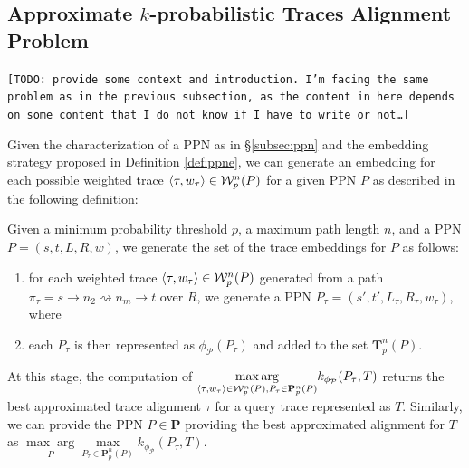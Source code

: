 \subsection{Approximate $k$-probabilistic Traces Alignment Problem}\label{subsec:akptap}
\texttt{\color{red}[TODO: provide some context and introduction. I'm facing the same problem as in the previous subsection, as the content in here depends on some content that I do not know if I have to write or not\dots]}

Given the characterization of a PPN as in \S\ref{subsec:ppn} and the embedding strategy proposed in Definition \ref{def:ppne}, we can generate an embedding for each possible weighted trace $\braket{\tau,w_\tau}\in\mathcal{W}_p^n(P)$ for a given PPN $P$ as described in the following definition:
\begin{definition}
Given a minimum probability threshold $p$, a maximum path length $n$, and a PPN $P=(s,t,L,R,w)$, we generate the set of the trace embeddings for $P$ as follows:
\begin{enumerate}
	\item for each weighted trace $\braket{\tau,w_\tau}\in\mathcal{W}_p^n(P)$ generated from a path $\pi_\tau=s\to n_2\rightsquigarrow n_m\to t$ over $R$, we generate a PPN $P_\tau=(s',t',L_\tau,R_\tau,w_\tau)$, where 
	\item each $P_\tau$ is then represented as $\phi_{\mathcal{P}}(P_\tau)$ and added to the set $\mathbf{T}_p^n(P)$.
\end{enumerate}
\end{definition}

At this stage, the computation of $\underset{\braket{\tau,w_\tau}\in \mathcal{W}_p^n(P), P_\tau\in\mathbf{P}_p^n(P)}{\max\arg} k_{\phi_\mathcal{P}}(P_\tau, T)$ returns the best approximated trace alignment $\tau$ for a query trace represented as $T$. Similarly, we can provide the PPN $P\in\mathbf{P}$ providing the best approximated alignment for $T$ as $\underset{P}{\max\arg}\underset{ P_\tau\in\mathbf{P}_p^n(P)}{\max} k_{\phi_\mathcal{P}}(P_\tau, T)$. 
